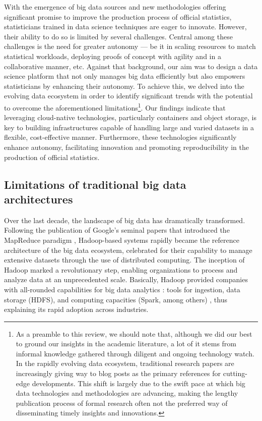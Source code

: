 With the emergence of big data sources and new methodologies offering significant promise to improve the production process of official statistics, statisticians trained in data science techniques are eager to innovate. However, their ability to do so is limited by several challenges. Central among these challenges is the need for greater autonomy — be it in scaling resources to match statistical workloads, deploying proofs of concept with agility and in a collaborative manner, etc. Against that background, our aim was to design a data science platform that not only manages big data efficiently but also empowers statisticians by enhancing their autonomy. To achieve this, we delved into the evolving data ecosystem in order to identify significant trends with the potential to overcome the aforementioned limitations\footnote{As a preamble to this review, we should note that, although we did our best to ground our insights in the academic literature, a lot of it stems from informal knowledge  gathered through diligent and ongoing technology watch. In the rapidly evolving data ecosystem, traditional research papers are increasingly giving way to blog posts as the primary references for cutting-edge developments. This shift is largely due to the swift pace at which big data technologies and methodologies are advancing, making the lengthy publication process of formal research often not the preferred way of disseminating timely insights and innovations.}. Our findings indicate that leveraging cloud-native technologies, particularly containers and object storage, is key to building infrastructures capable of handling large and varied datasets in a flexible, cost-effective manner. Furthermore, these technologies significantly enhance autonomy, facilitating innovation and promoting reproducibility in the production of official statistics.

\subsection{Limitations of traditional big data architectures}

Over the last decade, the landscape of big data has dramatically transformed. Following the publication of Google's seminal papers that introduced the MapReduce paradigm \cite{ghemawat2003google, dean2008mapreduce}, Hadoop-based systems rapidly became the reference architecture of the big data ecosystem, celebrated for their capability to manage extensive datasets through the use of distributed computing. The inception of Hadoop marked a revolutionary step, enabling organizations to process and analyze data at an unprecedented scale. Basically, Hadoop provided companies with all-rounded capabilities for big data analytics : tools for ingestion, data storage (HDFS), and computing capacities (Spark, among others) \cite{dhyani2014big}, thus explaining its rapid adoption across industries.

